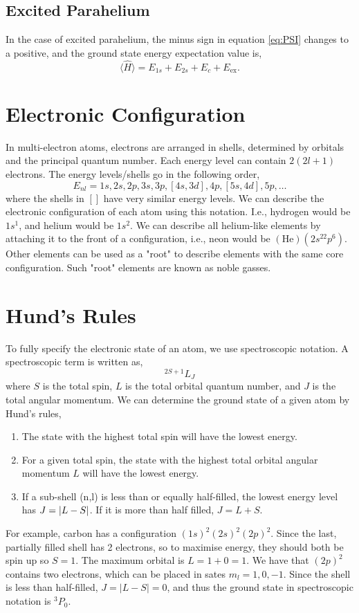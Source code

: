 \documentclass{book}
\begin{document}
\subsection{Excited Parahelium}
In the case of excited parahelium, the minus sign in equation \eqref{eq:PSI} changes to a positive, and the ground state energy expectation value is,
\begin{equation}
	\langle \hat{H} \rangle = E_{1s} + E_{2s} + E_{c} + E_{\text{ex}}.
\end{equation}
\section{Electronic Configuration}
In multi-electron atoms, electrons are arranged in shells, determined by orbitals and the principal quantum number. Each energy level can contain $2(2l +1)$ electrons. The energy levels/shells go in the following order,
\begin{equation}
	E_{nl} = 1s, 2s, 2p, 3s, 3p, \left[4s, 3d\right], 4p, \left[5s,4d\right], 5p, \ldots
\end{equation}
where the shells in $\left[\right]$ have very similar energy levels. We can describe the electronic configuration of each atom using this notation. I.e., hydrogen would be $1s^1$, and helium would be $1s^2$. We can describe all helium-like elements by attaching it to the front of a configuration, i.e., neon would be $(\text{He})(2s^22p^6)$. Other elements can be used as a "root" to describe elements with the same core configuration. Such "root" elements are known as noble gasses.
\section{Hund's Rules}
To fully specify the electronic state of an atom, we use spectroscopic notation. A spectroscopic term is written as,
\begin{equation}
	^{2S + 1}L_J
\end{equation}
where $S$ is the total spin, $L$ is the total orbital quantum number, and $J$ is the total angular momentum. We can determine the ground state of a given atom by Hund's rules, 
\begin{enumerate}
	\item The state with the highest total spin will have the lowest energy.
	\item For a given total spin, the state with the highest total orbital angular momentum $L$ will have the lowest energy.
	\item If a sub-shell (n,l) is less than or equally half-filled, the lowest energy level has $J = \abs{L - S}$. If it is more than half filled, $J = L + S$.
\end{enumerate}
For example, carbon has a configuration $(1s)^2(2s)^2(2p)^2$. Since the last, partially filled shell has 2 electrons, so to maximise energy, they should both be spin up so $S = 1$. The maximum orbital is $L = 1 + 0 = 1$. We have that $(2p)^2$ contains two electrons, which can be placed in sates $m_l = 1, 0, -1$. Since the shell is less than half-filled, $J = |L - S| = 0$, and thus the ground state in spectroscopic notation is $^3P_0$.
\end{document}
